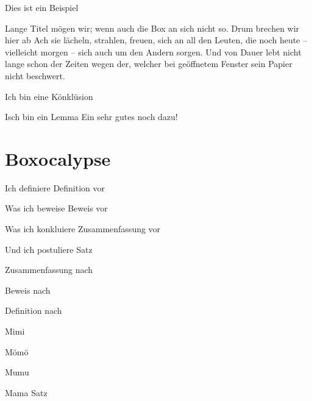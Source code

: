 \documentclass[twocolumn]{scrartcl}
\begin{document}
    \blindtext

    \begin{beispiel*}{Dies ist ein Beispiel}
        \blindtext
    \end{beispiel*}

    \blindtext

    \begin{definition*}{Lange Titel mögen wir; wenn auch die Box an sich nicht so. Drum brechen wir hier ab}
        \label{def:exdef}Ach sie lächeln, strahlen, freuen, sich an all den Leuten,
        die noch heute -- vielleicht morgen -- sich auch um den Andern sorgen. Und von Dauer lebt nicht lange schon der Zeiten wegen
        der, welcher bei geöffnetem Fenster sein Papier nicht beschwert.
    \end{definition*}

    \blindtext

    \begin{zusammenfassung}{Ich bin eine Könklüsion}
        \blindtext
    \end{zusammenfassung}

    \blindtext[1]

    \begin{lemma}{Isch bin ein Lemma}
        Ein sehr gutes noch dazu!
    \end{lemma}

    \blindtext[2]

    \listofdefinitions
    \listofremarks
    \listoftheorems
    \listofexamples
    \listoflemmas
    \listofsummaries
    \listofproofs

    \section{Boxocalypse}

    \begin{definition}{Ich definiere}
        Definition vor\\
        \begin{beweis}{Was ich beweise}
            Beweis vor\\
            \begin{zusammenfassung}{Was ich konkluiere}
                Zusammenfassung vor\\
                \begin{satz}{Und ich postuliere}
                    Satz
                \end{satz}
                Zusammenfassung nach
            \end{zusammenfassung}
            Beweis nach
        \end{beweis}
        Definition nach
    \end{definition}


    \begin{definition}{Mimi}
        \begin{beweis}{Mömö}
            \begin{zusammenfassung}{Mumu}
                \begin{satz}{Mama}
                    Satz
                \end{satz}
            \end{zusammenfassung}
        \end{beweis}
    \end{definition}
\end{document}
